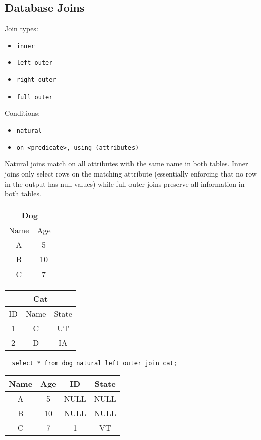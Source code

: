 \documentclass{math}
\begin{document}
\subsection*{Database Joins}
Join types:
\begin{itemize}
  \item \texttt{inner}
  \item \texttt{left outer}
  \item \texttt{right outer}
  \item \texttt{full outer}
\end{itemize}
Conditions:
\begin{itemize}
  \item \texttt{natural}
  \item \texttt{on \textless predicate\textgreater, using (attributes)}
\end{itemize}
Natural joins match on all attributes with the same name in both tables. Inner
joins only select rows on the matching attribute (essentially enforcing that
no row in the output has null values) while full outer joins preserve all
information in both tables.
\begin{center}
  \begin{tabular}{|c|c|}
    \hline
    \multicolumn{2}{|c|}{Dog} \\
    \hline
    Name & Age \\
    \hline
    A & 5 \\
    B & 10 \\
    C & 7 \\
    \hline
  \end{tabular}
  \begin{tabular}{|c|c|c|}
    \hline
    \multicolumn{3}{|c|}{Cat} \\
    \hline
    ID & Name & State \\
    \hline
    1 & C & UT \\
    2 & D & IA \\
    \hline
  \end{tabular}
\end{center}
\begin{lstlisting}
  select * from dog natural left outer join cat;
\end{lstlisting}
\begin{center}
  \begin{tabular}{|c|c|c|c|}
    \hline
    Name & Age & ID & State \\
    \hline
    A & 5 & NULL & NULL \\
    B & 10 & NULL & NULL \\
    C & 7 & 1 & VT \\
    \hline
  \end{tabular}
\end{center}
\end{document}
